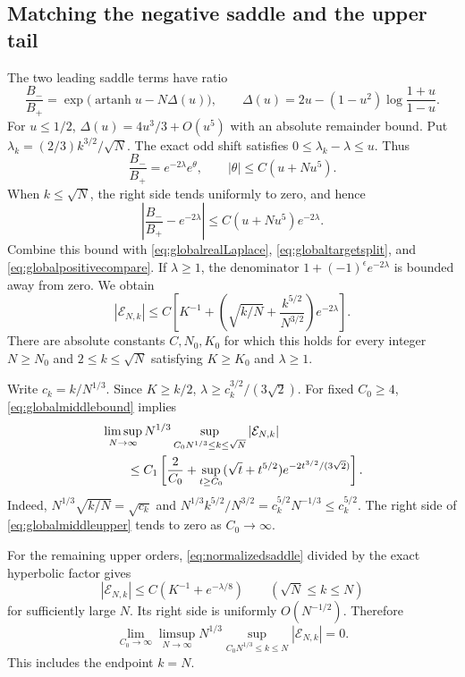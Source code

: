 \documentclass[11pt]{article}
\theoremstyle{definition}
\theoremstyle{remark}
\newcommand{\1}{\mathbf 1}
\begin{document}
\subsection{Matching the negative saddle and the upper tail}

The two leading saddle terms have ratio
\begin{equation}\label{eq:globalnegativeratio}
\frac{B_-}{B_+}
=\exp\bigl(\operatorname{artanh}u-N\Delta(u)\bigr),
\qquad
\Delta(u)=2u-(1-u^2)\log\frac{1+u}{1-u}.
\end{equation}
For $u\le1/2$, $\Delta(u)=4u^3/3+O(u^5)$ with an absolute remainder bound. Put $\lambda_k=(2/3)k^{3/2}/\sqrt N$. The exact odd shift satisfies $0\le\lambda_k-\lambda\le u$. Thus
\[
\frac{B_-}{B_+}=e^{-2\lambda}e^\theta,
\qquad |\theta|\le C(u+Nu^5).
\]
When $k\le\sqrt N$, the right side tends uniformly to zero, and hence
\[
\left|\frac{B_-}{B_+}-e^{-2\lambda}\right|
\le C(u+Nu^5)e^{-2\lambda}.
\]
Combine this bound with \eqref{eq:globalrealLaplace}, \eqref{eq:globaltargetsplit}, and \eqref{eq:globalpositivecompare}. If $\lambda\ge1$, the denominator $1+(-1)^\epsilon e^{-2\lambda}$ is bounded away from zero. We obtain
\begin{equation}\label{eq:globalmiddlebound}
|\mathcal E_{N,k}|\le C\left[
K^{-1}+\left(\sqrt{k/N}+\frac{k^{5/2}}{N^{3/2}}\right)e^{-2\lambda}\right].
\end{equation}
There are absolute constants $C,N_0,K_0$ for which this holds for every integer $N\ge N_0$ and $2\le k\le\sqrt N$ satisfying $K\ge K_0$ and $\lambda\ge1$.

Write $c_k=k/N^{1/3}$. Since $K\ge k/2$,
$\lambda\ge c_k^{3/2}/(3\sqrt2)$. For fixed $C_0\ge4$, \eqref{eq:globalmiddlebound} implies
\begin{align}
&\limsup_{N\to\infty}N^{1/3}
\sup_{C_0N^{1/3}\le k\le\sqrt N}|\mathcal E_{N,k}|\notag\\
&\qquad\le C_1\left[
\frac2{C_0}+\sup_{t\ge C_0}(\sqrt t+t^{5/2})
e^{-2t^{3/2}/(3\sqrt2)}\right].\label{eq:globalmiddleupper}
\end{align}
Indeed, $N^{1/3}\sqrt{k/N}=\sqrt{c_k}$ and
$N^{1/3}k^{5/2}/N^{3/2}=c_k^{5/2}N^{-1/3}\le c_k^{5/2}$. The right side of \eqref{eq:globalmiddleupper} tends to zero as $C_0\to\infty$.

For the remaining upper orders, \eqref{eq:normalizedsaddle} divided by the exact hyperbolic factor gives
\[
|\mathcal E_{N,k}|\le C(K^{-1}+e^{-\lambda/8})
\qquad(\sqrt N\le k\le N)
\]
for sufficiently large $N$. Its right side is uniformly $O(N^{-1/2})$. Therefore
\begin{equation}\label{eq:globaltailinfty}
\lim_{C_0\to\infty}\limsup_{N\to\infty}
N^{1/3}\sup_{C_0N^{1/3}\le k\le N}|\mathcal E_{N,k}|=0.
\end{equation}
This includes the endpoint $k=N$.
\end{document}
